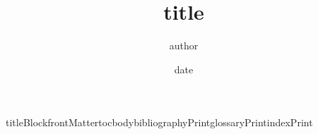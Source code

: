 \documentclass[{{paper}},11pt]{report}
\title{ {{title}} }\author{ {{author}} }\date{ {{date}} }
\begin{document}
{{titleBlock}}{{frontMatter}}{{toc}}{{body}}{{bibliographyPrint}}{{glossaryPrint}}{{indexPrint}}
\end{document}
